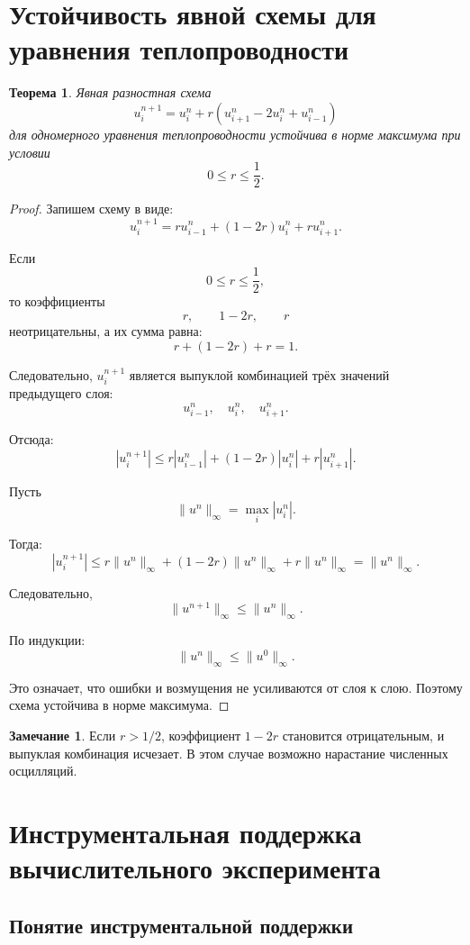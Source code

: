 \documentclass[12pt,a4paper]{article}
\theoremstyle{definition}
\newtheorem{remark}{Замечание}
\theoremstyle{plain}
\newtheorem{theorem}{Теорема}
\begin{document}
\section{Устойчивость явной схемы для уравнения теплопроводности}

\begin{theorem}
Явная разностная схема
\[
u_i^{n+1}
=
u_i^n+r(u_{i+1}^n-2u_i^n+u_{i-1}^n)
\]
для одномерного уравнения теплопроводности устойчива в норме максимума при условии
\[
0\le r\le \frac12.
\]
\end{theorem}

\begin{proof}
Запишем схему в виде:
\[
u_i^{n+1}
=
r u_{i-1}^n + (1-2r)u_i^n + r u_{i+1}^n.
\]

Если
\[
0\le r\le \frac12,
\]
то коэффициенты
\[
r,\qquad 1-2r,\qquad r
\]
неотрицательны, а их сумма равна:
\[
r+(1-2r)+r=1.
\]

Следовательно, $u_i^{n+1}$ является выпуклой комбинацией трёх значений предыдущего слоя:
\[
u_{i-1}^n,\quad u_i^n,\quad u_{i+1}^n.
\]

Отсюда:
\[
|u_i^{n+1}|
\le
r|u_{i-1}^n|+(1-2r)|u_i^n|+r|u_{i+1}^n|.
\]

Пусть
\[
\|u^n\|_\infty=\max_i |u_i^n|.
\]

Тогда:
\[
|u_i^{n+1}|
\le
r\|u^n\|_\infty+(1-2r)\|u^n\|_\infty+r\|u^n\|_\infty
=
\|u^n\|_\infty.
\]

Следовательно,
\[
\|u^{n+1}\|_\infty \le \|u^n\|_\infty.
\]

По индукции:
\[
\|u^n\|_\infty \le \|u^0\|_\infty.
\]

Это означает, что ошибки и возмущения не усиливаются от слоя к слою. Поэтому схема устойчива в норме максимума.
\end{proof}

\begin{remark}
Если $r>1/2$, коэффициент $1-2r$ становится отрицательным, и выпуклая комбинация исчезает. В этом случае возможно нарастание численных осцилляций.
\end{remark}

\section{Инструментальная поддержка вычислительного эксперимента}

\subsection{Понятие инструментальной поддержки}
\end{document}
